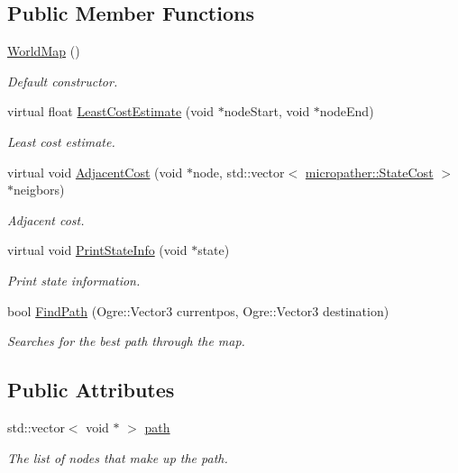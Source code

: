 \subsection*{Public Member Functions}
\begin{DoxyCompactItemize}
\item 
\hyperlink{class_world_map_ad079799989e80b5469c880b8b40e000e}{World\-Map} ()
\begin{DoxyCompactList}\small\item\em Default constructor. \end{DoxyCompactList}\item 
virtual float \hyperlink{class_world_map_a1303b34f21eed11133f8e9895f30121b}{Least\-Cost\-Estimate} (void $\ast$node\-Start, void $\ast$node\-End)
\begin{DoxyCompactList}\small\item\em Least cost estimate. \end{DoxyCompactList}\item 
virtual void \hyperlink{class_world_map_ad82627bde4d4e778f819d2ee9c55bd35}{Adjacent\-Cost} (void $\ast$node, std\-::vector$<$ \hyperlink{structmicropather_1_1_state_cost}{micropather\-::\-State\-Cost} $>$ $\ast$neigbors)
\begin{DoxyCompactList}\small\item\em Adjacent cost. \end{DoxyCompactList}\item 
virtual void \hyperlink{class_world_map_a545c1c031a72cc21ec4c7e9d6103fad7}{Print\-State\-Info} (void $\ast$state)
\begin{DoxyCompactList}\small\item\em Print state information. \end{DoxyCompactList}\item 
bool \hyperlink{class_world_map_afb44a7b557fb1e5ba553ac584f4c1cd3}{Find\-Path} (Ogre\-::\-Vector3 currentpos, Ogre\-::\-Vector3 destination)
\begin{DoxyCompactList}\small\item\em Searches for the best path through the map. \end{DoxyCompactList}\end{DoxyCompactItemize}
\subsection*{Public Attributes}
\begin{DoxyCompactItemize}
\item 
\hypertarget{class_world_map_aea93e909abf8d808f65f8779a49b6b69}{std\-::vector$<$ void $\ast$ $>$ \hyperlink{class_world_map_aea93e909abf8d808f65f8779a49b6b69}{path}}\label{class_world_map_aea93e909abf8d808f65f8779a49b6b69}

\begin{DoxyCompactList}\small\item\em The list of nodes that make up the path. \end{DoxyCompactList}\end{DoxyCompactItemize}


